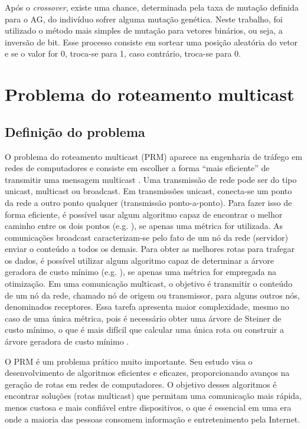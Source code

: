 Após o \textit{crossover}, existe uma chance, determinada pela taxa de mutação definida para o AG, do indivíduo sofrer alguma mutação genética. Neste trabalho, foi utilizado o método mais simples de mutação para vetores binários, ou seja, a inversão de bit. Esse processo consiste em sortear uma posição aleatória do vetor e se o valor for 0, troca-se para 1, caso contrário, troca-se para 0.

\section{Problema do roteamento multicast}
\label{section_problemas_prm}

\subsection{Definição do problema}
\label{section_prm_definicao}

O problema do roteamento multicast (PRM) aparece na engenharia de tráfego em redes de computadores e consiste em escolher a forma ``mais eficiente'' de transmitir uma mensagem multicast \cite{Lafeta2016}. Uma transmissão de rede pode ser do tipo unicast, multicast ou broadcast. Em transmissões unicast, conecta-se um ponto da rede a outro ponto qualquer (transmissão ponto-a-ponto). Para fazer isso de forma eficiente, é possível usar algum algoritmo capaz de encontrar o melhor caminho entre os dois pontos (e.g. \cite{Dijkstra1959}), se apenas uma métrica for utilizada. As comunicações broadcast caracterizam-se pelo fato de um nó da rede (servidor) enviar o conteúdo a todos os demais. Para obter as melhores rotas para trafegar os dados, é possível utilizar algum algoritmo capaz de determinar a árvore geradora de custo mínimo (e.g. \cite{Prim1957}), se apenas uma métrica for empregada na otimização. Em uma comunicação multicast, o objetivo é transmitir o conteúdo de um nó da rede, chamado nó de origem ou transmissor, para alguns outros nós, denominados receptores. Essa tarefa apresenta maior complexidade, mesmo no caso de uma única métrica, pois é necessário obter uma árvore de Steiner de custo mínimo, o que é mais difícil que calcular uma única rota ou construir a árvore geradora de custo mínimo \cite{Bueno2010}.

O PRM é um problema prático muito importante. Seu estudo visa o desenvolvimento de algoritmos eficientes e eficazes, proporcionando avanços na geração de rotas em redes de computadores. O objetivo desses algoritmos é encontrar soluções (rotas multicast) que permitam uma comunicação mais rápida, menos custosa e mais confiável entre dispositivos, o que é essencial em uma era onde a maioria das pessoas consomem informação e entretenimento pela Internet.

